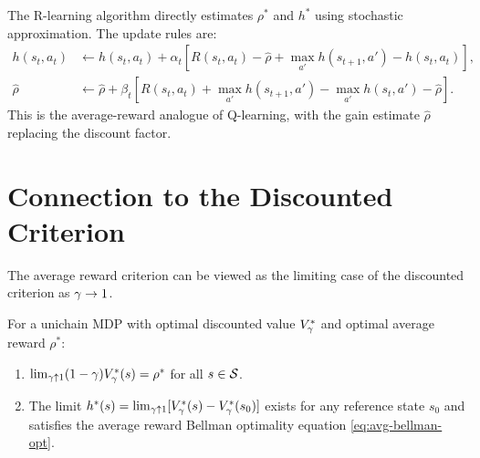 \documentclass[11pt,a4paper]{article}
\begin{document}
\begin{rlconnection}[title={Gain-Bias Equations and R-Learning}]
The R-learning algorithm directly estimates $\rho^*$ and $h^*$ using
stochastic approximation. The update rules are:
\begin{align*}
    h(s_t, a_t) &\leftarrow h(s_t, a_t) + \alpha_t
    [R(s_t, a_t) - \hat{\rho} + \max_{a'} h(s_{t+1}, a') -
    h(s_t, a_t)], \\
    \hat{\rho} &\leftarrow \hat{\rho} + \beta_t
    [R(s_t, a_t) + \max_{a'} h(s_{t+1}, a') -
    \max_{a'} h(s_t, a') - \hat{\rho}].
\end{align*}
This is the average-reward analogue of Q-learning, with the
gain estimate $\hat{\rho}$ replacing the discount factor.
\end{rlconnection}


\section{Connection to the Discounted Criterion}
\label{sec:discount-connection}

The average reward criterion can be viewed as the limiting case of
the discounted criterion as $\gamma \to 1$.

\begin{theorem}
\label{thm:discount-to-average}
For a unichain MDP with optimal discounted value $V^*_\gamma$
and optimal average reward $\rho^*$:
\begin{enumerate}[nosep]
    \item $\lim_{\gamma \uparrow 1} (1-\gamma)
    V^*_\gamma(s) = \rho^*$ for all $s \in \mathcal{S}$.
    \item The limit $h^*(s) = \lim_{\gamma \uparrow 1}
    [V^*_\gamma(s) - V^*_\gamma(s_0)]$ exists for any
    reference state $s_0$ and satisfies the average reward
    Bellman optimality equation \eqref{eq:avg-bellman-opt}.
\end{enumerate}
\end{theorem}
\end{document}
